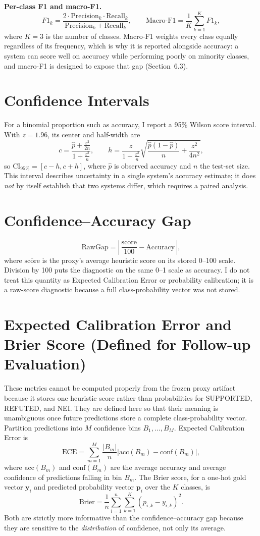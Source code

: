 \documentclass[12pt,a4paper,openany]{report}
\begin{document}
\textbf{Per-class F1 and macro-F1.}
\[
F1_k = \frac{2 \cdot \mathrm{Precision}_k \cdot \mathrm{Recall}_k}{\mathrm{Precision}_k + \mathrm{Recall}_k}, \qquad
\mathrm{Macro\text{-}F1} = \frac{1}{K}\sum_{k=1}^{K} F1_k,
\]
where $K=3$ is the number of classes. Macro-F1 weights every class equally regardless of its frequency, which is why it is reported alongside accuracy: a system can score well on accuracy while performing poorly on minority classes, and macro-F1 is designed to expose that gap (Section~6.3).

\section{Confidence Intervals}
For a binomial proportion such as accuracy, I report a 95\% Wilson score interval. With $z=1.96$, its center and half-width are
\[
c=\frac{\hat p+\frac{z^2}{2n}}{1+\frac{z^2}{n}},\qquad
h=\frac{z}{1+\frac{z^2}{n}}
\sqrt{\frac{\hat p(1-\hat p)}{n}+\frac{z^2}{4n^2}},
\]
so $\mathrm{CI}_{95\%}=[c-h,c+h]$, where $\hat p$ is observed accuracy and $n$ the test-set size. This interval describes uncertainty in a single system's accuracy estimate; it does \emph{not} by itself establish that two systems differ, which requires a paired analysis.

\section{Confidence--Accuracy Gap}
\[
\mathrm{RawGap} = \left|\, \frac{\overline{\mathrm{score}}}{100} - \mathrm{Accuracy} \,\right|,
\]
where $\overline{\mathrm{score}}$ is the proxy's average heuristic score on its stored 0--100 scale. Division by 100 puts the diagnostic on the same 0--1 scale as accuracy. I do not treat this quantity as Expected Calibration Error or probability calibration; it is a raw-score diagnostic because a full class-probability vector was not stored.

\section{Expected Calibration Error and Brier Score (Defined for Follow-up Evaluation)}
These metrics cannot be computed properly from the frozen proxy artifact because it stores one heuristic score rather than probabilities for SUPPORTED, REFUTED, and NEI. They are defined here so that their meaning is unambiguous once future predictions store a complete class-probability vector. Partition predictions into $M$ confidence bins $B_1,\ldots,B_M$. Expected Calibration Error is
\[
\mathrm{ECE} = \sum_{m=1}^{M} \frac{|B_m|}{n} \left| \mathrm{acc}(B_m) - \mathrm{conf}(B_m) \right|,
\]
where $\mathrm{acc}(B_m)$ and $\mathrm{conf}(B_m)$ are the average accuracy and average confidence of predictions falling in bin $B_m$. The Brier score, for a one-hot gold vector $\mathbf{y}_i$ and predicted probability vector $\mathbf{p}_i$ over the $K$ classes, is
\[
\mathrm{Brier} = \frac{1}{n}\sum_{i=1}^{n}\sum_{k=1}^{K} (p_{i,k} - y_{i,k})^2 .
\]
Both are strictly more informative than the confidence--accuracy gap because they are sensitive to the \emph{distribution} of confidence, not only its average.
\end{document}
